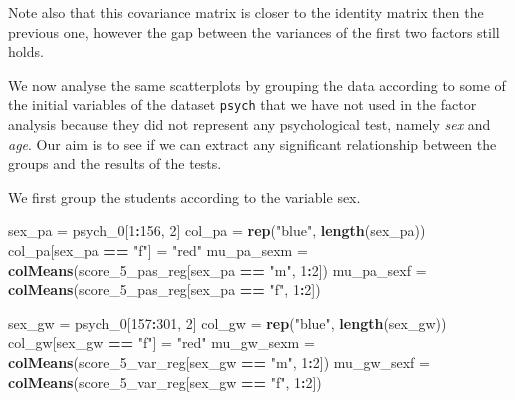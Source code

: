 \documentclass[
]{article}
\newenvironment{Shaded}{\begin{snugshade}}{\end{snugshade}}
\newcommand{\DecValTok}[1]{\textcolor[rgb]{0.00,0.00,0.81}{#1}}
\newcommand{\FunctionTok}[1]{\textcolor[rgb]{0.13,0.29,0.53}{\textbf{#1}}}
\newcommand{\NormalTok}[1]{#1}
\newcommand{\OtherTok}[1]{\textcolor[rgb]{0.56,0.35,0.01}{#1}}
\newcommand{\SpecialCharTok}[1]{\textcolor[rgb]{0.81,0.36,0.00}{\textbf{#1}}}
\newcommand{\StringTok}[1]{\textcolor[rgb]{0.31,0.60,0.02}{#1}}
\theoremstyle{plain}
\begin{document}
Note also that this covariance matrix is closer to the identity matrix
then the previous one, however the gap between the variances of the
first two factors still holds.

We now analyse the same scatterplots by grouping the data according to
some of the initial variables of the dataset \texttt{psych} that we have
not used in the factor analysis because they did not represent any
psychological test, namely \textit{sex} and \textit{age}. Our aim is to
see if we can extract any significant relationship between the groups
and the results of the tests.

We first group the students according to the variable sex.

\smallskip

\begin{Shaded}
\begin{Highlighting}[]
\NormalTok{sex\_pa }\OtherTok{=}\NormalTok{ psych\_0[}\DecValTok{1}\SpecialCharTok{:}\DecValTok{156}\NormalTok{, }\DecValTok{2}\NormalTok{]}
\NormalTok{col\_pa }\OtherTok{=} \FunctionTok{rep}\NormalTok{(}\StringTok{"blue"}\NormalTok{, }\FunctionTok{length}\NormalTok{(sex\_pa))}
\NormalTok{col\_pa[sex\_pa }\SpecialCharTok{==} \StringTok{"f"}\NormalTok{] }\OtherTok{=} \StringTok{"red"}
\NormalTok{mu\_pa\_sexm }\OtherTok{=} \FunctionTok{colMeans}\NormalTok{(score\_5\_pas\_reg[sex\_pa }\SpecialCharTok{==} \StringTok{"m"}\NormalTok{, }\DecValTok{1}\SpecialCharTok{:}\DecValTok{2}\NormalTok{])}
\NormalTok{mu\_pa\_sexf }\OtherTok{=} \FunctionTok{colMeans}\NormalTok{(score\_5\_pas\_reg[sex\_pa }\SpecialCharTok{==} \StringTok{"f"}\NormalTok{, }\DecValTok{1}\SpecialCharTok{:}\DecValTok{2}\NormalTok{])}
\end{Highlighting}
\end{Shaded}

\begin{Shaded}
\begin{Highlighting}[]
\NormalTok{sex\_gw }\OtherTok{=}\NormalTok{ psych\_0[}\DecValTok{157}\SpecialCharTok{:}\DecValTok{301}\NormalTok{, }\DecValTok{2}\NormalTok{]}
\NormalTok{col\_gw }\OtherTok{=} \FunctionTok{rep}\NormalTok{(}\StringTok{"blue"}\NormalTok{, }\FunctionTok{length}\NormalTok{(sex\_gw))}
\NormalTok{col\_gw[sex\_gw }\SpecialCharTok{==} \StringTok{"f"}\NormalTok{] }\OtherTok{=} \StringTok{"red"}
\NormalTok{mu\_gw\_sexm }\OtherTok{=} \FunctionTok{colMeans}\NormalTok{(score\_5\_var\_reg[sex\_gw }\SpecialCharTok{==} \StringTok{"m"}\NormalTok{, }\DecValTok{1}\SpecialCharTok{:}\DecValTok{2}\NormalTok{])}
\NormalTok{mu\_gw\_sexf }\OtherTok{=} \FunctionTok{colMeans}\NormalTok{(score\_5\_var\_reg[sex\_gw }\SpecialCharTok{==} \StringTok{"f"}\NormalTok{, }\DecValTok{1}\SpecialCharTok{:}\DecValTok{2}\NormalTok{])}
\end{Highlighting}
\end{Shaded}
\end{document}
